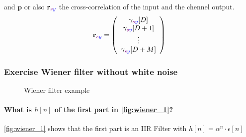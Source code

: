 and $\boldsymbol{p}$ or also $\mathbf{r}_{\textcolor{violet}{s} \textcolor{blue}{y}}$ the cross-correlation of the input and the chennel output.
$$
\mathbf{r}_{\textcolor{violet}{s} \textcolor{blue}{y}}=\left(\begin{array}{c}
\gamma_{\textcolor{violet}{s} \textcolor{blue}{y}}[D] \\
\gamma_{\textcolor{violet}{s} \textcolor{blue}{y}}[D+1] \\
\vdots \\
\gamma_{\textcolor{violet}{s} \textcolor{blue}{y}}[D+M]
\end{array}\right)
$$
\subsubsection{Exercise Wiener filter without white noise}
\begin{figure}[ht]
  \centering
  \caption{Wiener filter example}
  \label{fig:wiener_1}
\end{figure}
\paragraph{What is $h[n]$ of the first part in \autoref{fig:wiener_1}?}\mbox{}\newline
\autoref{fig:wiener_1} shows that the first part is an IIR Filter with $h[n]=\alpha^n \cdot \epsilon[n]$
